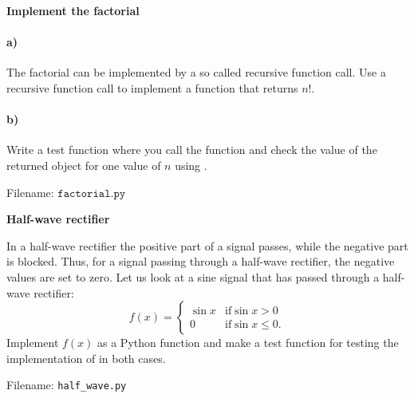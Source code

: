 \begin{Problem}{\textbf{Implement the factorial}}
\paragraph{a)} The factorial can be implemented by a so called recursive function
call. Use a recursive function call to implement a function  that returns $n!$.

\paragraph{b)} Write a test function where you call the 
function and check the value of the returned object for one value of $n$ using
.

Filename: $\texttt{factorial.py}$
\end{Problem}


\begin{Problem}{\textbf{Half-wave rectifier}} \label{prob34}

\noindent In a half-wave rectifier the positive part of a signal passes, while the negative
part is blocked. Thus, for a signal passing through a half-wave rectifier, 
the negative values are set to zero.
Let us look at a sine signal that has passed through a half-wave rectifier:
\begin{equation*}
f(x) = \begin{cases} 
      \sin x & \mathrm{if} \sin x > 0 \\
      0 & \mathrm{if} \sin x \leq 0.
   \end{cases}
\end{equation*}
Implement $f(x)$ as a Python function  and make a test function
for testing the implementation of  in both cases.

Filename: \texttt{half\_wave.py}
\end{Problem}


